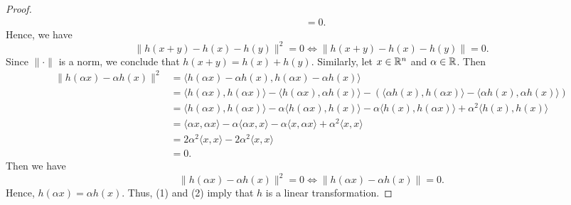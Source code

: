 \documentclass[a4paper]{article}
\begin{document}
\begin{proof}
\begin{align*}
                                 &= 0. 
\end{align*}
Hence, we have 
\[ \|h(x+y) - h(x) - h(y)\|^{2} = 0 \iff \|h(x+y) - h(x) - h(y)\| = 0. \]
Since \( \|\cdot\| \) is a norm, we conclude that \( h(x+y) = h(x) + h(y) \). Similarly, let \( x \in \mathbb{R}^{n} \) and \( \alpha \in \mathbb{R}  \). Then 
\begin{align*}
    \|h(\alpha x ) - \alpha h(x) \|^{2} &= \langle h(\alpha x) - \alpha h(x) , h(\alpha x) - \alpha h(x) \rangle \\
                                        &= \langle h(\alpha x)  , h(\alpha x) \rangle - \langle h(\alpha x) , \alpha h(x) \rangle - (\langle \alpha h(x) ,  h(\alpha x) \rangle - \langle \alpha h(x) , \alpha h(x) \rangle) \\
                                        &= \langle h(\alpha x) , h(\alpha x) \rangle - \alpha \langle  h(\alpha x ) , h(x) \rangle - \alpha \langle  h(x) , h(\alpha x) \rangle + \alpha^{2} \langle h(x) , h(x) \rangle \\
                                        &= \langle \alpha x  ,  \alpha x  \rangle - \alpha \langle \alpha x  ,  x  \rangle - \alpha \langle x  ,  \alpha x  \rangle + \alpha^{2} \langle x , x \rangle \\
                                        &= 2\alpha^{2} \langle x , x \rangle - 2 \alpha^{2} \langle x , x \rangle \\ 
                                        &= 0. 
\end{align*}
Then we have 
\[  \|h(\alpha x) - \alpha h(x)\|^{2} = 0 \iff \|h(\alpha x ) - \alpha h(x)\| = 0.  \]
Hence, \( h(\alpha x) = \alpha h(x) \). Thus, (1) and (2) imply that \( h  \) is a linear transformation.
\end{proof}
\end{document}
